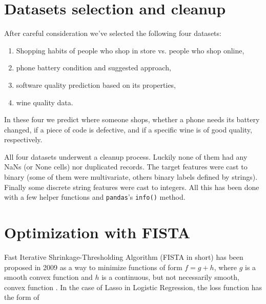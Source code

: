 \documentclass{article}
\begin{document}

\section{Datasets selection and cleanup}

After careful consideration we've selected the following four datasets:

\begin{enumerate}
    \item Shopping habits of people who shop in store vs. people who shop online,
    \item phone battery condition and suggested approach,
    \item software quality prediction based on its properties,
    \item wine quality data.
\end{enumerate}

In these four we predict where someone shops, whether a phone needs its battery changed, if a piece of code is defective, and if a specific wine is of good quality, respectively.

All four datasets underwent a cleanup process. Luckily none of them had any NaNs (or None cells) nor duplicated records. The target features were cast to binary (some of them were multivariate, others binary labels defined by strings). Finally some discrete string features were cast to integers. All this has been done with a few helper functions and \verb|pandas|'s \verb|info()| method.

\section{Optimization with FISTA}


Fast Iterative Shrinkage-Thresholding Algorithm (FISTA in short) has been proposed in 2009 as a way to minimize functions of form $f = g + h$, where $g$ is a smooth convex function and $h$ is a continuous, but not necessarily smooth, convex function \cite{fista}. In the case of Lasso in Logistic Regression, the loss function has the form of
\end{document}
